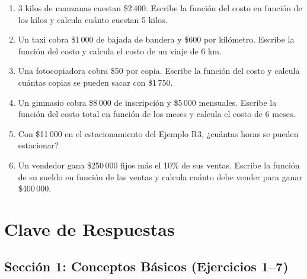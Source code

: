 \documentclass[12pt, letterpaper]{article}
\begin{document}
\begin{enumerate}[leftmargin=*, resume]
  \item \facil{} 3 kilos de manzanas cuestan \$2\,400. Escribe la función del costo en función de los kilos y calcula cuánto cuestan 5 kilos.

  \item \facil{} Un taxi cobra \$1\,000 de bajada de bandera y \$600 por kilómetro. Escribe la función del costo y calcula el costo de un viaje de 6 km.

  \item \medio{} Una fotocopiadora cobra \$50 por copia. Escribe la función del costo y calcula cuántas copias se pueden sacar con \$1\,750.

  \item \medio{} Un gimnasio cobra \$8\,000 de inscripción y \$5\,000 mensuales. Escribe la función del costo total en función de los meses y calcula el costo de 6 meses.

  \item \medio{} Con \$11\,000 en el estacionamiento del Ejemplo R3, ¿cuántas horas se pueden estacionar?

  \item \dificil{} Un vendedor gana \$250\,000 fijos más el 10\% de sus ventas. Escribe la función de su sueldo en función de las ventas y calcula cuánto debe vender para ganar \$400\,000.

\end{enumerate}
\newpage

\ifmwclaves
  \section{Clave de Respuestas}

  \subsection*{Sección 1: Conceptos Básicos (Ejercicios 1--7)}
\end{document}

